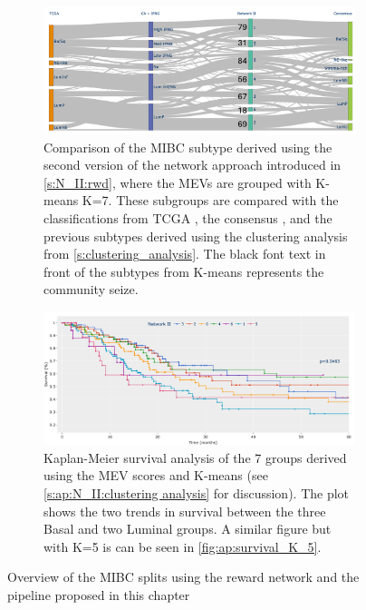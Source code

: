 \begin{figure}[!htb]
    \centering
    \begin{subfigure}[!t]{1.0\textwidth}
        \includegraphics[width=1.0\textwidth,height=1.0\textheight,keepaspectratio]{Sections/Network_II/resources/reward/cluster_comp_final.png}
        \caption{Comparison of the MIBC subtype derived using the second version of the network approach introduced in \cref{s:N_II:rwd}, where the MEVs are grouped with K-means K=7. These subgroups are compared with the classifications from TCGA \citep{Robertson2017-mg}, the consensus \citep{Kamoun2020-tj}, and the previous subtypes derived using the clustering analysis from \cref{s:clustering_analysis}. The black font text in front of the subtypes from K-means represents the community seize.}
        \label{fig:N_II:mibc_comp}
    \end{subfigure}
    \begin{subfigure}[!t]{1.0\textwidth}
        \includegraphics[width=1.0\textwidth,height=1.0\textheight,keepaspectratio]{Sections/Network_II/resources/reward/cluster_analysis/survival_K_7.png}
        \caption[Overview of the MIBC subgroups derived from the non-tumour reward network]{Kaplan-Meier survival analysis of the 7 groups derived using the MEV scores and K-means (see \ref{s:ap:N_II:clustering analysis} for discussion). The plot shows the two trends in survival between the three Basal and two Luminal groups. A similar figure but with K=5 is can be seen in \cref{fig:ap:survival_K_5}. }
        \label{fig:N_II:survival_K_7}
    \end{subfigure} 
    \caption{Overview of the MIBC splits using the reward network and the pipeline proposed in this chapter}
\end{figure}


